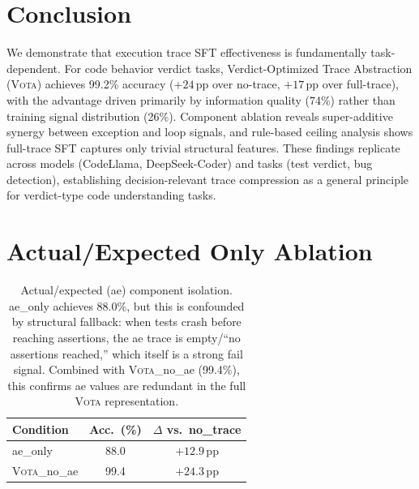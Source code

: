 \documentclass[11pt,a4paper]{article}
\newcommand{\vota}{\textsc{Vota}}
\newcommand{\pp}{\,\text{pp}}
\begin{document}
\section{Conclusion}
\label{sec:conclusion}

We demonstrate that execution trace SFT effectiveness is fundamentally task-dependent.
For code behavior verdict tasks, Verdict-Optimized Trace Abstraction (\vota{}) achieves 99.2\% accuracy ($+24\pp$ over no-trace, $+17\pp$ over full-trace), with the advantage driven primarily by information quality (74\%) rather than training signal distribution (26\%).
Component ablation reveals super-additive synergy between exception and loop signals, and rule-based ceiling analysis shows full-trace SFT captures only trivial structural features.
These findings replicate across models (CodeLlama, DeepSeek-Coder) and tasks (test verdict, bug detection), establishing decision-relevant trace compression as a general principle for verdict-type code understanding tasks.





\newpage
\appendix

\section{Actual/Expected Only Ablation}
\label{app:ae_only}

\begin{table}[h]
\centering
\small
\begin{tabular}{lcc}
\toprule
\textbf{Condition} & \textbf{Acc.\ (\%)} & \textbf{$\Delta$ vs.\ no\_trace} \\
\midrule
ae\_only & 88.0 & $+12.9\pp$ \\
\vota{}\_no\_ae & 99.4 & $+24.3\pp$ \\
\bottomrule
\end{tabular}
\caption{Actual/expected (ae) component isolation. ae\_only achieves 88.0\%, but this is confounded by structural fallback: when tests crash before reaching assertions, the ae trace is empty/``no assertions reached,'' which itself is a strong fail signal. Combined with \vota{}\_no\_ae (99.4\%), this confirms ae values are redundant in the full \vota{} representation.}
\label{tab:ae_only}
\end{table}
\end{document}
